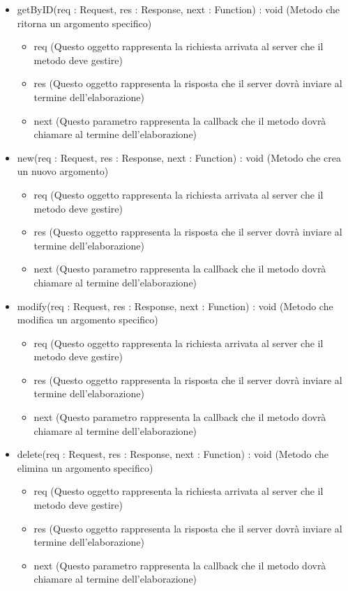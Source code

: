 \begin{description}
\begin{itemize}
\item getByID(req : Request, res : Response, next : Function) : void (Metodo che ritorna un argomento specifico)\begin{itemize}
\item req (Questo oggetto rappresenta la richiesta arrivata al server che il metodo deve gestire)
\item res (Questo oggetto rappresenta la risposta che il server dovrà inviare al termine dell'elaborazione)
\item next (Questo parametro rappresenta la callback che il metodo dovrà chiamare al termine dell’elaborazione)
\end{itemize}

\item new(req : Request, res : Response, next : Function) : void (Metodo che crea un nuovo argomento)\begin{itemize}
\item req (Questo oggetto rappresenta la richiesta arrivata al server che il metodo deve gestire)
\item res (Questo oggetto rappresenta la risposta che il server dovrà inviare al termine dell'elaborazione)
\item next (Questo parametro rappresenta la callback che il metodo dovrà chiamare al termine dell’elaborazione)
\end{itemize}

\item modify(req : Request, res : Response, next : Function) : void (Metodo che modifica un argomento specifico)\begin{itemize}
\item req (Questo oggetto rappresenta la richiesta arrivata al server che il metodo deve gestire)
\item res (Questo oggetto rappresenta la risposta che il server dovrà inviare al termine dell'elaborazione)
\item next (Questo parametro rappresenta la callback che il metodo dovrà chiamare al termine dell’elaborazione)
\end{itemize}

\item delete(req : Request, res : Response, next : Function) : void (Metodo che elimina un argomento specifico)\begin{itemize}
\item req (Questo oggetto rappresenta la richiesta arrivata al server che il metodo deve gestire)
\item res (Questo oggetto rappresenta la risposta che il server dovrà inviare al termine dell'elaborazione)
\item next (Questo parametro rappresenta la callback che il metodo dovrà chiamare al termine dell’elaborazione)
\end{itemize}

\end{itemize}

\end{description}

